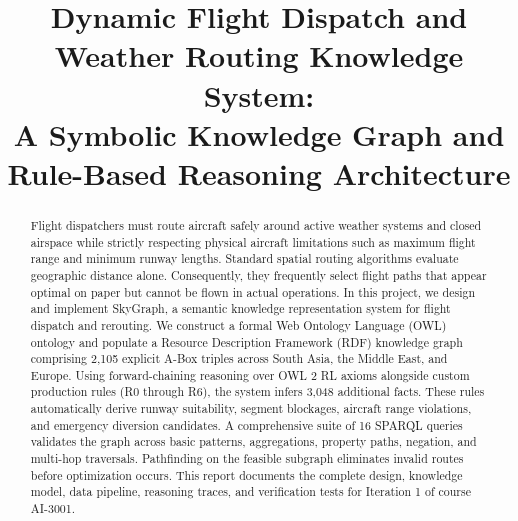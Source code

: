 \documentclass[conference]{IEEEtran}
\begin{document}
\title{Dynamic Flight Dispatch and Weather Routing Knowledge System:\\A Symbolic Knowledge Graph and Rule-Based Reasoning Architecture}

\author{
  \and
  \and
}

\maketitle

\begin{abstract}
Flight dispatchers must route aircraft safely around active weather systems and closed airspace while strictly respecting physical aircraft limitations such as maximum flight range and minimum runway lengths. Standard spatial routing algorithms evaluate geographic distance alone. Consequently, they frequently select flight paths that appear optimal on paper but cannot be flown in actual operations. In this project, we design and implement SkyGraph, a semantic knowledge representation system for flight dispatch and rerouting. We construct a formal Web Ontology Language (OWL) ontology and populate a Resource Description Framework (RDF) knowledge graph comprising 2,105 explicit A-Box triples across South Asia, the Middle East, and Europe. Using forward-chaining reasoning over OWL 2 RL axioms alongside custom production rules (R0 through R6), the system infers 3,048 additional facts. These rules automatically derive runway suitability, segment blockages, aircraft range violations, and emergency diversion candidates. A comprehensive suite of 16 SPARQL queries validates the graph across basic patterns, aggregations, property paths, negation, and multi-hop traversals. Pathfinding on the feasible subgraph eliminates invalid routes before optimization occurs. This report documents the complete design, knowledge model, data pipeline, reasoning traces, and verification tests for Iteration 1 of course AI-3001.
\end{abstract}
\end{document}
